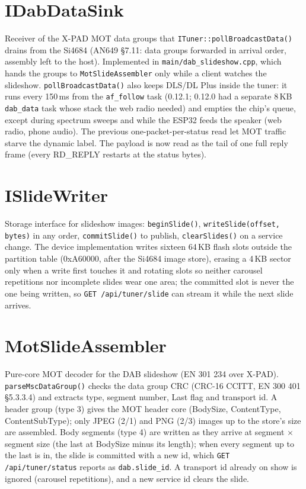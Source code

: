 \section{IDabDataSink}\label{cls:IDabDataSink}
Receiver of the X-PAD MOT data groups that \texttt{ITuner::pollBroadcastData()}
drains from the Si4684 (AN649 \S7.11: data groups forwarded in arrival
order, assembly left to the host). Implemented in
\texttt{main/dab\_slideshow.cpp}, which hands the groups to
\texttt{MotSlideAssembler} only while a client watches the slideshow.
\texttt{pollBroadcastData()} also keeps DLS/DL Plus inside the tuner: it runs
every 150\,ms from the \texttt{af\_follow} task (0.12.1; 0.12.0 had a
separate 8\,KB \texttt{dab\_data} task whose stack the web radio needed)
and empties the chip's queue, except during spectrum sweeps and while the
ESP32 feeds the speaker (web radio, phone audio). The previous one-packet-per-status read let MOT traffic
starve the dynamic label. The payload is now read as the tail of one full
reply frame (every RD\_REPLY restarts at the status bytes).

\section{ISlideWriter}\label{cls:ISlideWriter}
Storage interface for slideshow images: \texttt{beginSlide()},
\texttt{writeSlide(offset, bytes)} in any order, \texttt{commitSlide()}
to publish, \texttt{clearSlides()} on a service change. The device
implementation writes sixteen 64\,KB flash slots outside the partition
table (0xA60000, after the Si4684 image store), erasing a 4\,KB sector
only when a write first touches it and rotating slots so neither carousel
repetitions nor incomplete slides wear one area; the committed slot is
never the one being written, so \texttt{GET /api/tuner/slide} can stream
it while the next slide arrives.

\section{MotSlideAssembler}\label{cls:MotSlideAssembler}
Pure-core MOT decoder for the DAB slideshow (EN 301 234 over X-PAD).
\texttt{parseMscDataGroup()} checks the data group CRC (CRC-16 CCITT,
EN 300 401 \S5.3.3.4) and extracts type, segment number, Last flag and
transport id. A header group (type 3) gives the MOT header core
(BodySize, ContentType, ContentSubType); only JPEG (2/1) and PNG (2/3)
images up to the store's size are assembled. Body segments (type 4) are
written as they arrive at segment $\times$ segment size (the last at
BodySize minus its length); when every segment up to the last is in, the
slide is committed with a new id, which \texttt{GET /api/tuner/status}
reports as \texttt{dab.slide\_id}. A transport id already on show is
ignored (carousel repetitions), and a new service id clears the slide.

